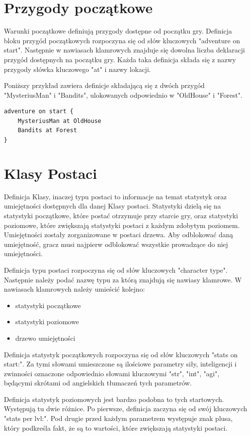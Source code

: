 \documentclass	{xmgr}
\begin{document}
\section{Przygody początkowe} 
Warunki początkowe definiują przygody dostępne od początku gry. Definicja bloku przygód początkowych rozpoczyna się od słów kluczowych
"adventure on start". Następnie w nawiasach klamrowych znajduje się dowolna liczba deklaracji przygód dostępnych na początku gry.
Każda taka definicja składa się z nazwy przygody słówka kluczowego "at" i nazwy lokacji.

Poniższy przykład zawiera definicje składającą się z dwóch przygód "MysteriusMan" i "Bandits", ulokowanych odpowiednio w "OldHouse" i "Forest".
\begin{lstlisting}
adventure on start {
	MysteriusMan at OldHouse
	Bandits at Forest
}
\end{lstlisting}
\section{Klasy Postaci}
Definicja Klasy, inaczej typu postaci to informacje na temat statystyk oraz umiejętności dostępnych dla danej Klasy postaci. Statystyki dzielą się na statystyki początkowe, które postać otrzymuje przy starcie gry, oraz statystyki poziomowe, które zwiększają statystyki postaci z każdym zdobytym poziomem. Umiejętności zostały zorganizowane w postaci drzewa. Aby odblokować daną umiejętność, gracz musi najpierw odblokować wszystkie prowadzące do niej umiejętności.

Definicja typu postaci rozpoczyna się od słów kluczowych "character type". Następnie należy podać nazwę typu za którą znajdują się nawiasy klamrowe. W nawiasach klamrowych należy umieścić kolejno:
\begin{itemize}
	\item statystyki początkowe
	\item statystyki poziomowe
	\item drzewo umiejętności
\end{itemize}

Definicja statystyk początkowych rozpoczyna się od słów kluczowych "stats on start:". Za tymi słowami umieszczone są ilościowe parametry siły, inteligencji i zwinności oznaczone odpowiednio słowami kluczowymi "str", "int", "agi", będącymi skrótami od angielskich tłumaczeń tych parametrów.

Definicja statystyk poziomowych jest bardzo podobna to tych startowych. Występują tu dwie różnice. Po pierwsze, definicja zaczyna się od swój kluczowych "stats per lvl:". Pod drugie przed każdym parametrem występuje znak plusa, który podkreśla fakt, że są to wartości, które zwiększają statystyki postaci. 
\end{document}

